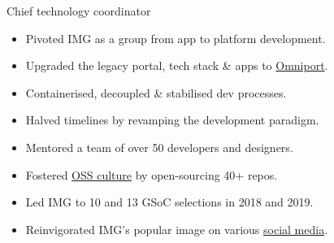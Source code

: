 \rolesubsubsection
  {Chief technology coordinator}
  {}

\begin{sectiondescription}
  \begin{itemize}[nosep, leftmargin = *]
    \item Pivoted IMG as a group from app to platform development.
    \item Upgraded the legacy portal, tech stack \& apps to \href{https://omniport.readthedocs.io/}{Omniport}.
    \item Containerised, decoupled \& stabilised dev processes.
    \item Halved timelines by revamping the development paradigm.
    \item Mentored a team of over 50 developers and designers.
    \item Fostered \href{https://github.com/IMGIITRoorkee/}{OSS culture} by open-sourcing 40+ repos.
    \item Led IMG to 10 and 13 GSoC selections in 2018 and 2019.
    \item Reinvigorated IMG's popular image on various \href{https://facebook.com/IMGIITRoorkee}{social media}.
  \end{itemize}
\end{sectiondescription}